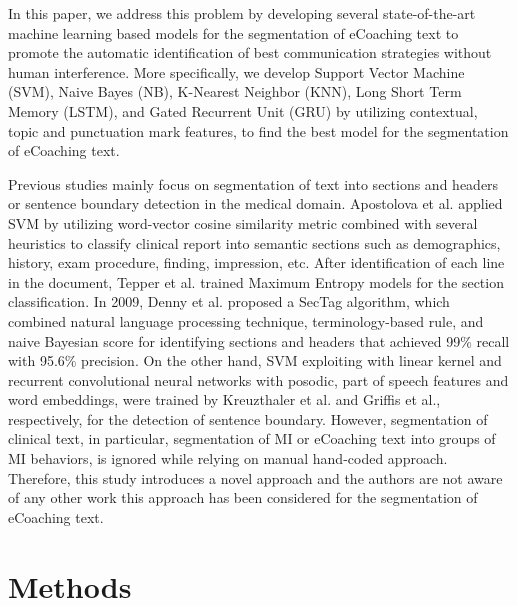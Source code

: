 \documentclass{amia}
\begin{document}
In this paper, we address this problem by developing several state-of-the-art machine learning based models for the segmentation of eCoaching text to promote the automatic identification of best communication strategies without human interference. More specifically, we develop Support Vector Machine (SVM), Naive Bayes (NB), K-Nearest Neighbor (KNN), Long Short Term Memory (LSTM), and Gated Recurrent Unit (GRU) by utilizing contextual, topic and punctuation mark features, to find the best model for the segmentation of eCoaching text. 

Previous studies mainly focus on segmentation of text into sections and headers\cite{apostolova2009automatic,denny2009evaluation,tepper2012statistical,cho2002text} or sentence boundary detection\cite{griffis2016quantitative,kreuzthaler2015detection,treviso2016sentence} in the medical domain. Apostolova et al.\cite{apostolova2009automatic} applied SVM by utilizing word-vector cosine similarity metric combined with several heuristics to classify clinical report into semantic sections such as demographics, history, exam procedure, finding, impression, etc. After identification of each line in the document, Tepper et al. \cite{tepper2012statistical} trained Maximum Entropy models for the section classification. In 2009, Denny et al.\cite{denny2009evaluation} proposed a SecTag algorithm, which combined natural language processing technique, terminology-based rule, and naive Bayesian score for identifying sections and headers that achieved 99\% recall with 95.6\% precision. On the other hand, SVM exploiting with linear kernel and recurrent convolutional neural networks with posodic, part of speech features and word embeddings, were trained by Kreuzthaler et al.\cite{kreuzthaler2015detection} and Griffis et al.\cite{griffis2016quantitative}, respectively, for the detection of sentence boundary. However, segmentation of clinical text, in particular, segmentation of MI or eCoaching text into groups of MI behaviors, is ignored while relying on manual hand-coded approach. Therefore, this study introduces a novel approach and the authors are not aware of any other work this approach has been considered for the segmentation of eCoaching text.  

\section*{Methods}
\end{document}
